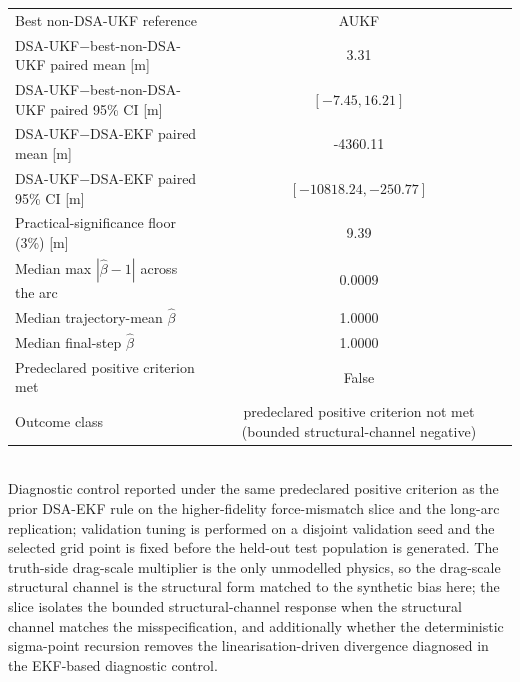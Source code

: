 \begin{table}[!htbp]
{\begin{tabular}{lc}
    \midrule
    Best non-DSA-UKF reference & AUKF \\
    DSA-UKF$-$best-non-DSA-UKF paired mean [m] & 3.31 \\
    DSA-UKF$-$best-non-DSA-UKF paired 95\% CI [m] & $[-7.45, 16.21]$ \\
    DSA-UKF$-$DSA-EKF paired mean [m] & -4360.11 \\
    DSA-UKF$-$DSA-EKF paired 95\% CI [m] & $[-10818.24, -250.77]$ \\
    Practical-significance floor (3\%) [m] & 9.39 \\
    Median max $|\hat{\beta}-1|$ across the arc & 0.0009 \\
    Median trajectory-mean $\hat{\beta}$ & 1.0000 \\
    Median final-step $\hat{\beta}$ & 1.0000 \\
    Predeclared positive criterion met & False \\
    Outcome class & predeclared positive criterion not met (bounded structural-channel negative) \\
    \bottomrule
  \end{tabular}
  }
  \\[2pt] {\footnotesize Diagnostic control reported under the same predeclared positive criterion as the prior DSA-EKF rule on the higher-fidelity force-mismatch slice and the long-arc replication; validation tuning is performed on a disjoint validation seed and the selected grid point is fixed before the held-out test population is generated. The truth-side drag-scale multiplier is the only unmodelled physics, so the drag-scale structural channel is the structural form matched to the synthetic bias here; the slice isolates the bounded structural-channel response when the structural channel matches the misspecification, and additionally whether the deterministic sigma-point recursion removes the linearisation-driven divergence diagnosed in the EKF-based diagnostic control.}
\end{table}